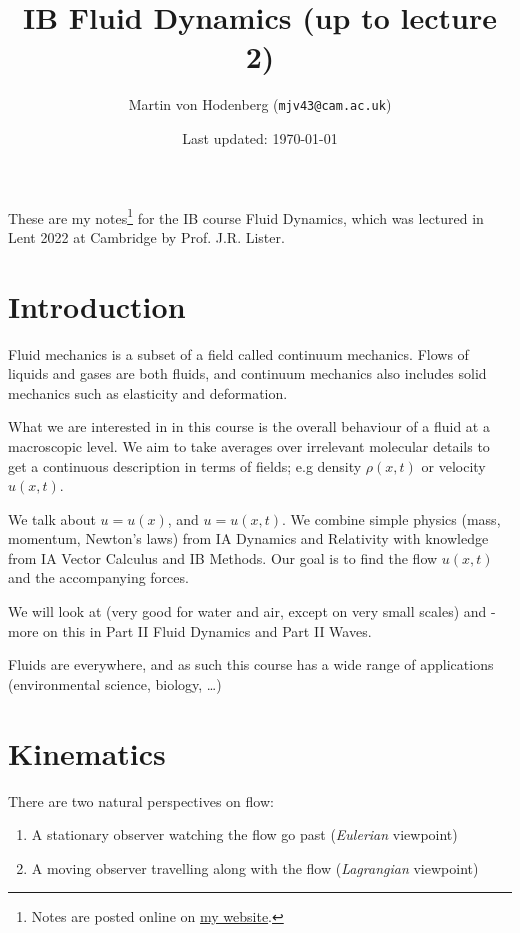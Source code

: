 \documentclass[egregdoesnotlikesansseriftitles,a4paper]{scrartcl}
\title{IB Fluid Dynamics (up to lecture 2)}
\author{Martin von Hodenberg (\texttt{mjv43@cam.ac.uk})}
\date{Last updated: \today}
\begin{document}
\maketitle
These are my notes\footnote{Notes are posted online on \href{https://mjv43.user.srcf.net/}{my website}.} for the IB course Fluid Dynamics, which was lectured in Lent 2022 at Cambridge by Prof. J.R. Lister.
\newpage
\tableofcontents
\newpage

\section{Introduction}
Fluid mechanics is a subset of a field called continuum mechanics. Flows of liquids and gases are both fluids, and continuum mechanics also includes solid mechanics such as elasticity and deformation. 

What we are interested in in this course is the overall behaviour of a fluid at a macroscopic level. We aim to take averages over irrelevant molecular details to get a continuous description in terms of fields; e.g density $\rho (x,t)$ or velocity $u (x,t)$.

We talk about  $u=u (x)$, and  $u=u (x,t)$. We combine simple physics (mass, momentum, Newton's laws) from IA Dynamics and Relativity with knowledge from IA Vector Calculus and IB Methods. Our goal is to find the flow $u (x,t)$ and the accompanying forces. 

We will look at  (very good for water and air, except on very small scales) and  - more on this in Part II Fluid Dynamics and Part II Waves.

Fluids are everywhere, and as such this course has a wide range of applications (environmental science, biology, \ldots)

\section{Kinematics}
There are two natural perspectives on flow:
\begin{enumerate}
    \item A stationary observer watching the flow go past (\emph{Eulerian} viewpoint)
    \item A moving observer travelling along with the flow (\emph{Lagrangian} viewpoint)
\end{enumerate}
\end{document}
